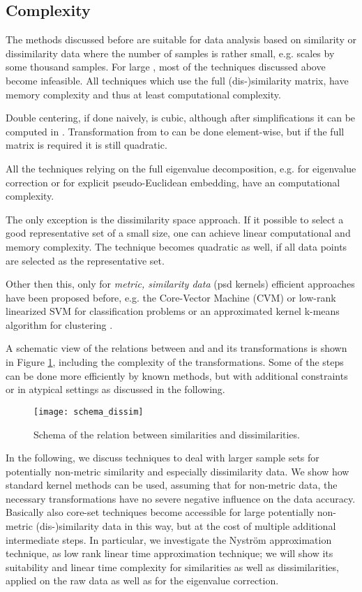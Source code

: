 \documentclass[twoside,11pt]{article}
\begin{document}
\subsection{Complexity}
The methods discussed before are suitable for data analysis based on similarity or dissimilarity data
where the number of samples  is rather small, e.g. scales by some thousand samples. 
For large , most of the techniques discussed above become infeasible.
All techniques which use the full (dis-)similarity matrix,
have  memory complexity
and thus at least  computational complexity.

Double centering, if done naively, is cubic,
although after simplifications it can be computed in .
Transformation from  to  can be done element-wise,
but if the full matrix is required it is still quadratic.

All the techniques relying on the full eigenvalue decomposition,
e.g. for eigenvalue correction or for explicit pseudo-Euclidean embedding,
have an  computational complexity.

The only exception is the dissimilarity space approach.
If it possible to select a good representative set of a small size,
one can achieve linear computational and memory complexity.
The technique becomes quadratic as well,
if all data points are selected as the representative set.

Other then this,
only for \emph{metric, similarity data} (psd kernels) efficient approaches have been proposed before, e.g. 
the Core-Vector Machine (CVM) \cite{DBLP:conf/icml/TsangKK07} or low-rank linearized SVM \cite{DBLP:journals/jmlr/ZhangLWM12}
for classification problems or an approximated kernel k-means algorithm for clustering \cite{DBLP:conf/kdd/ChittaJHJ11}.


A schematic view of the relations between  and  and its transformations
is shown in Figure \ref{fig:simdis_schema}, including the complexity of the transformations.
Some of the steps can be done more efficiently by known methods,
but with additional constraints or in atypical settings as discussed in the following.

\begin{figure}
	\centering
	\texttt{[image: schema\_dissim]}
	\caption{Schema of the relation between similarities and dissimilarities.}
	\label{fig:simdis_schema}
\end{figure}

In the following, we discuss techniques to deal with larger sample sets
for potentially non-metric similarity and especially dissimilarity data.
We show how standard kernel methods can be used,
assuming that for non-metric data,
the necessary transformations have no severe negative
influence on the data accuracy. Basically also core-set techniques \cite{DBLP:journals/comgeo/BadoiuC08}
become accessible for large potentially non-metric (dis-)similarity data in this way, but at the cost of multiple additional intermediate steps.
In particular, we investigate the Nystr\"om approximation technique,
as low rank linear time approximation technique;
we will show its suitability and linear time complexity
for similarities as well as dissimilarities,
applied on the raw data as well as for the eigenvalue correction.
\end{document}
